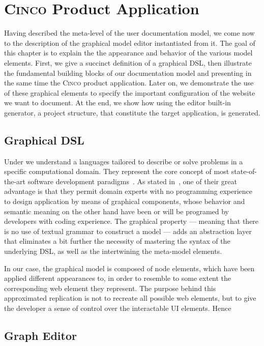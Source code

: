 \chapter{\textsc{Cinco} Product Application}\label{ch:CP}

Having described the meta-level of the user documentation model, we come now to the description of the graphical model editor instantiated from it. The goal of this chapter is to explain the the appearance and behavior of the various model elements. First, we give a succinct definition of a graphical DSL, then illustrate the fundamental building blocks of our documentation model and presenting in the same time the \textsc{Cinco} product application. Later on, we demonstrate the use of these graphical elements to specify the important configuration of the website we want to document. At the end, we show how using the editor built-in generator, a project structure, that constitute the target application, is generated.

\section{Graphical DSL}\label{sec:gDSL}

Under  we understand a languages tailored to describe or solve problems in a specific computational domain. They represent the core concept of most state-of-the-art software development paradigms~\cite{perez-et_al}. As stated in~\cite{Naujokat2018}, one of their great advantage is that they permit domain experts with no programming experience to design application by means of graphical components, whose behavior and semantic meaning on the other hand have been or will be programed by developers with coding experience. The graphical property --- meaning that there is no use of textual grammar to construct a model --- adds an abstraction layer that eliminates a bit further the necessity of mastering the syntax of the underlying DSL, as well as the  intertwining the meta-model elements.

In our case, the graphical model is composed of node elements, which have been applied different appearances to, in order to resemble to some extent the corresponding web element they represent. The purpose behind this approximated replication is not to recreate all possible web elements, but to give the developer a sense of control over the interactable UI elements. Hence

\section{Graph Editor}\label{sec:graphEditor}

